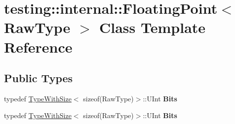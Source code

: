 \hypertarget{classtesting_1_1internal_1_1_floating_point}{}\section{testing\+:\+:internal\+:\+:Floating\+Point$<$ Raw\+Type $>$ Class Template Reference}
\label{classtesting_1_1internal_1_1_floating_point}
\subsection*{Public Types}
\begin{DoxyCompactItemize}
\item 
\hypertarget{classtesting_1_1internal_1_1_floating_point_abf228bf6cd48f12c8b44c85b4971a731}{}typedef \hyperlink{classtesting_1_1internal_1_1_type_with_size}{Type\+With\+Size}$<$ sizeof(Raw\+Type)$>$\+::U\+Int {\bfseries Bits}\label{classtesting_1_1internal_1_1_floating_point_abf228bf6cd48f12c8b44c85b4971a731}

\item 
\hypertarget{classtesting_1_1internal_1_1_floating_point_abf228bf6cd48f12c8b44c85b4971a731}{}typedef \hyperlink{classtesting_1_1internal_1_1_type_with_size}{Type\+With\+Size}$<$ sizeof(Raw\+Type)$>$\+::U\+Int {\bfseries Bits}\label{classtesting_1_1internal_1_1_floating_point_abf228bf6cd48f12c8b44c85b4971a731}

\end{DoxyCompactItemize}
